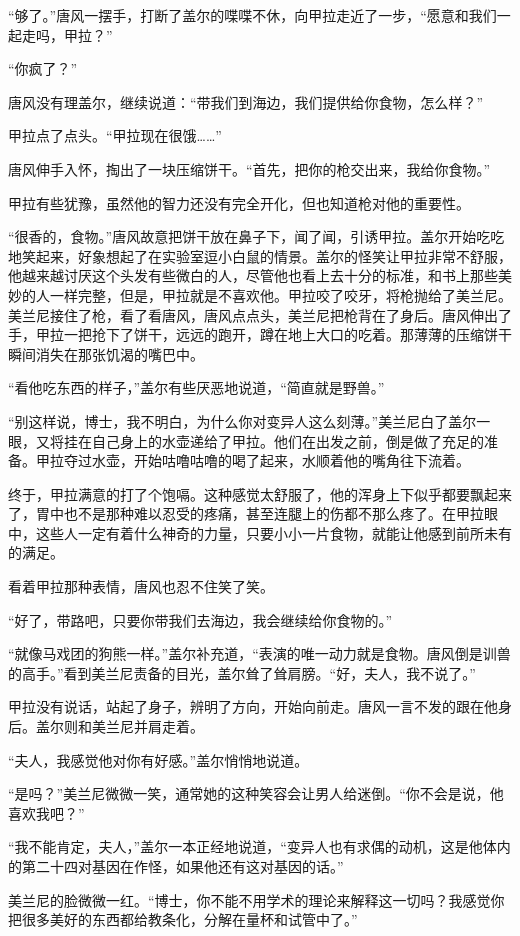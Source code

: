 “够了。”唐风一摆手，打断了盖尔的喋喋不休，向甲拉走近了一步，“愿意和我们一起走吗，甲拉？”

“你疯了？”

唐风没有理盖尔，继续说道：“带我们到海边，我们提供给你食物，怎么样？”

甲拉点了点头。“甲拉现在很饿……”

唐风伸手入怀，掏出了一块压缩饼干。“首先，把你的枪交出来，我给你食物。”

甲拉有些犹豫，虽然他的智力还没有完全开化，但也知道枪对他的重要性。

“很香的，食物。”唐风故意把饼干放在鼻子下，闻了闻，引诱甲拉。盖尔开始吃吃地笑起来，好象想起了在实验室逗小白鼠的情景。盖尔的怪笑让甲拉非常不舒服，他越来越讨厌这个头发有些微白的人，尽管他也看上去十分的标准，和书上那些美妙的人一样完整，但是，甲拉就是不喜欢他。甲拉咬了咬牙，将枪抛给了美兰尼。美兰尼接住了枪，看了看唐风，唐风点点头，美兰尼把枪背在了身后。唐风伸出了手，甲拉一把抢下了饼干，远远的跑开，蹲在地上大口的吃着。那薄薄的压缩饼干瞬间消失在那张饥渴的嘴巴中。

“看他吃东西的样子，”盖尔有些厌恶地说道，“简直就是野兽。”

“别这样说，博士，我不明白，为什么你对变异人这么刻薄。”美兰尼白了盖尔一眼，又将挂在自己身上的水壶递给了甲拉。他们在出发之前，倒是做了充足的准备。甲拉夺过水壶，开始咕噜咕噜的喝了起来，水顺着他的嘴角往下流着。

终于，甲拉满意的打了个饱嗝。这种感觉太舒服了，他的浑身上下似乎都要飘起来了，胃中也不是那种难以忍受的疼痛，甚至连腿上的伤都不那么疼了。在甲拉眼中，这些人一定有着什么神奇的力量，只要小小一片食物，就能让他感到前所未有的满足。

看着甲拉那种表情，唐风也忍不住笑了笑。

“好了，带路吧，只要你带我们去海边，我会继续给你食物的。”

“就像马戏团的狗熊一样。”盖尔补充道，“表演的唯一动力就是食物。唐风倒是训兽的高手。”看到美兰尼责备的目光，盖尔耸了耸肩膀。“好，夫人，我不说了。”

甲拉没有说话，站起了身子，辨明了方向，开始向前走。唐风一言不发的跟在他身后。盖尔则和美兰尼并肩走着。

“夫人，我感觉他对你有好感。”盖尔悄悄地说道。

“是吗？”美兰尼微微一笑，通常她的这种笑容会让男人给迷倒。“你不会是说，他喜欢我吧？”

“我不能肯定，夫人，”盖尔一本正经地说道，“变异人也有求偶的动机，这是他体内的第二十四对基因在作怪，如果他还有这对基因的话。”

美兰尼的脸微微一红。“博士，你不能不用学术的理论来解释这一切吗？我感觉你把很多美好的东西都给教条化，分解在量杯和试管中了。”


